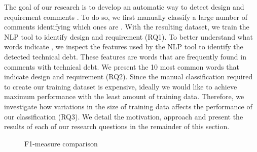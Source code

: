 The goal of our research is to develop an automatic way to detect design and requirement \SATD comments . To do so, we first manually classify a large number of comments identifying which ones are \SATD. With the resulting dataset, we train the NLP tool to identify design and requirement \SATD (RQ1). To better understand what words indicate \SATD, we inspect the features used by the NLP tool to identify the detected technical debt. These features are words that are frequently found in comments with technical debt. We present the 10 most common words that indicate design and requirement \SATD (RQ2). Since the manual classification required to create our training dataset is expensive, ideally we would like to achieve maximum performance with the least amount of training data. Therefore, we investigate how variations in the size of training data affects the performance of our classification (RQ3). We detail the motivation, approach and present the results of each of our research questions in the remainder of this section.    

\begin{figure}[!thb]
  \centering
  \caption{F1-measure comparison}
\end{figure}


